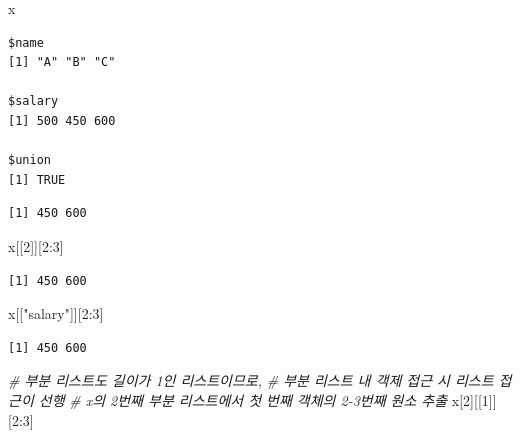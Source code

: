 \documentclass[
  11pt,
]{krantz}
\newenvironment{Shaded}{\begin{snugshade}}{\end{snugshade}}
\newcommand{\CommentTok}[1]{\textcolor[rgb]{0.37,0.37,0.37}{\textit{#1}}}
\newcommand{\DecValTok}[1]{\textcolor[rgb]{0.06,0.06,0.06}{#1}}
\newcommand{\NormalTok}[1]{#1}
\newcommand{\SpecialCharTok}[1]{\textcolor[rgb]{0,0,0}{#1}}
\newcommand{\StringTok}[1]{\textcolor[rgb]{0.5,0.5,0.5}{#1}}
\begin{document}
\begin{Shaded}
\begin{Highlighting}[]
\NormalTok{x}
\end{Highlighting}
\end{Shaded}

\begin{verbatim}
$name
[1] "A" "B" "C"

$salary
[1] 500 450 600

$union
[1] TRUE
\end{verbatim}

\begin{Shaded}
\end{Shaded}

\begin{verbatim}
[1] 450 600
\end{verbatim}

\begin{Shaded}
\begin{Highlighting}[]
\NormalTok{x[[}\DecValTok{2}\NormalTok{]][}\DecValTok{2}\SpecialCharTok{:}\DecValTok{3}\NormalTok{]}
\end{Highlighting}
\end{Shaded}

\begin{verbatim}
[1] 450 600
\end{verbatim}

\begin{Shaded}
\begin{Highlighting}[]
\NormalTok{x[[}\StringTok{"salary"}\NormalTok{]][}\DecValTok{2}\SpecialCharTok{:}\DecValTok{3}\NormalTok{]}
\end{Highlighting}
\end{Shaded}

\begin{verbatim}
[1] 450 600
\end{verbatim}

\begin{Shaded}
\begin{Highlighting}[]
\CommentTok{\# 부분 리스트도 길이가 1인 리스트이므로, }
\CommentTok{\# 부분 리스트 내 객제 접근 시 리스트 접근이 선행}
\CommentTok{\# x의 2번째 부분 리스트에서 첫 번째 객체의 2{-}3번째 원소 추출}
\NormalTok{x[}\DecValTok{2}\NormalTok{][[}\DecValTok{1}\NormalTok{]][}\DecValTok{2}\SpecialCharTok{:}\DecValTok{3}\NormalTok{]}
\end{Highlighting}
\end{Shaded}
\end{document}
